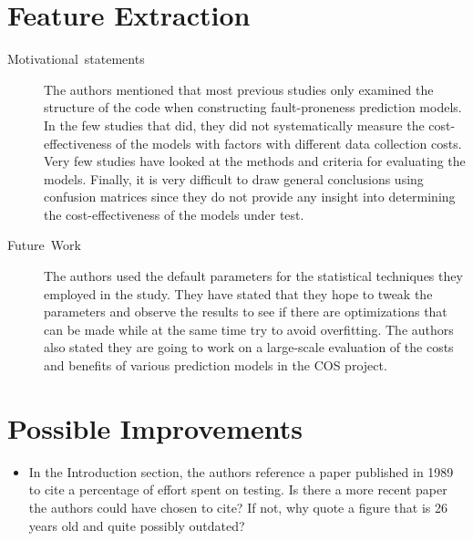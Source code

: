 \documentclass[english]{article}
\begin{document}
\section*{Feature Extraction}
\begin{description}
\item [{Motivational~statements}] The authors mentioned that most previous
studies only examined the structure of the code when constructing
fault-proneness prediction models. In the few studies that did, they
did not systematically measure the cost-effectiveness of the models
with factors with different data collection costs. Very few studies
have looked at the methods and criteria for evaluating the models.
Finally, it is very difficult to draw general conclusions using confusion
matrices since they do not provide any insight into determining the
cost-effectiveness of the models under test.
\item [{Future~Work}] The authors used the default parameters for the
statistical techniques they employed in the study. They have stated
that they hope to tweak the parameters and observe the results to
see if there are optimizations that can be made while at the same
time try to avoid overfitting. The authors also stated they are going
to work on a large-scale evaluation of the costs and benefits of various
prediction models in the COS project.
\end{description}

\section*{Possible Improvements}
\begin{itemize}
\item In the Introduction section, the authors reference a paper published
in 1989 to cite a percentage of effort spent on testing. Is there
a more recent paper the authors could have chosen to cite? If not,
why quote a figure that is 26 years old and quite possibly outdated?\end{itemize}
\end{document}
